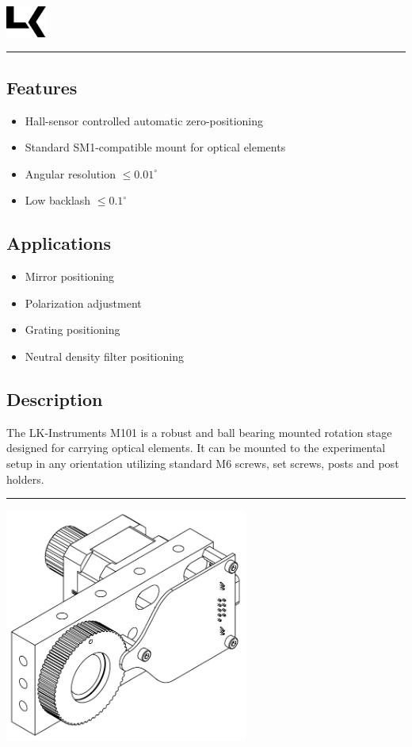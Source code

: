 \documentclass[a4paper, final, 12pt, oneside]{scrartcl}
\numberwithin{equation}{section}
\numberwithin{table}{section}
\numberwithin{figure}{section}
\begin{document}
\thispagestyle{empty}
\includegraphics[width=0.1\textwidth]{../general/logo_black.pdf}
\hfill {\Huge \textbf{\textsf{\productName}}} \hfill {\Huge \textbf{\textsf{\productNumber}}}\\
\noindent\rule{\textwidth}{0.4pt}

\begin{multicols}{2}
\subsection*{Features}
\begin{itemize}
  \item[] Hall-sensor controlled automatic zero-positioning
  \item[] Standard SM1-compatible mount for optical elements
  \item[] Angular resolution $\leq 0.01^{\circ}$
  \item[] Low backlash $\leq 0.1^{\circ}$
\end{itemize}
\FloatBarrier

\subsection*{Applications}
\begin{itemize}
  \item[] Mirror positioning
  \item[] Polarization adjustment
  \item[] Grating positioning
  \item[] Neutral density filter positioning
\end{itemize}
\FloatBarrier

\subsection*{Description}
The LK-Instruments M101 is a robust and ball bearing mounted rotation
stage designed for carrying optical elements. It can be mounted to the
experimental setup in any orientation utilizing standard M6 screws, set screws,
posts and post holders.
\end{multicols}
\noindent\rule{\textwidth}{0.4pt}
\vspace*{0.5cm}

\centerline{\includegraphics[width=0.6\textwidth]{./drawings/m101_full_dwg.pdf}}
\end{document}
